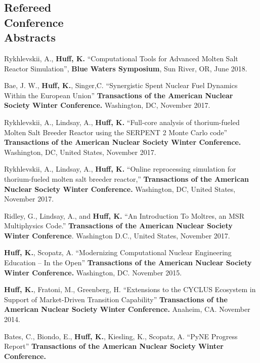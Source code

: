 \documentclass[margin,line]{resume}
\begin{document}
\begin{resume}
    \section{\mysidestyle Refereed\\Conference\\Abstracts}
    \begin{bibenum}
    \item Rykhlevskii, A., \textbf{Huff, K.} ``Computational Tools for Advanced
            Molten Salt Reactor Simulation'', \textbf{Blue Waters Symposium},
            Sun River, OR, June 2018.
    \item Bae, J. W., \textbf{Huff, K.}, Singer,C. ``Synergistic Spent Nuclear Fuel Dynamics Within the European Union''
            \textbf{Transactions of the American Nuclear Society Winter Conference.}
            Washington, DC, November 2017.
    \item Rykhlevskii, A., Lindsay, A., \textbf{Huff, K.} ``Full-core analysis of thorium-fueled Molten Salt Breeder Reactor using the SERPENT 2 Monte Carlo code''
            \textbf{Transactions of the American Nuclear Society Winter Conference.}
            Washington, DC, United States, November 2017.
    \item Rykhlevskii, A., Lindsay, A., \textbf{Huff, K.} ``Online reprocessing simulation for thorium-fueled molten salt breeder reactor,''
            \textbf{Transactions of the American Nuclear Society Winter Conference.}
            Washington, DC, United States, November 2017.
    \item Ridley, G., Lindsay, A., and \textbf{Huff, K.} ``An
            Introduction To Moltres, an MSR Multiphysics Code.'' \textbf{Transactions
            of the American Nuclear Society Winter Conference}. Washington
            D.C., United States, November 2017.
      \item \textbf{Huff, K.}, Scopatz, A. ``Modernizing Computational Nuclear Engineering Education -- In the Open''
         \textbf{Transactions of the American Nuclear Society Winter Conference.}
         Washington, DC. November 2015.
      \item \textbf{Huff, K.}, Fratoni, M., Greenberg, H. ``Extensions to the CYCLUS Ecosystem in Support of Market-Driven Transition Capability''
         \textbf{Transactions of the American Nuclear Society Winter Conference.}
         Anaheim, CA. November 2014.
      \item Bates, C., Biondo, E., \textbf{Huff, K.}, Kiesling, K., Scopatz, A. ``PyNE Progress Report''
         \textbf{Transactions of the American Nuclear Society Winter Conference.}

\end{bibenum}
\end{resume}
\end{document}
